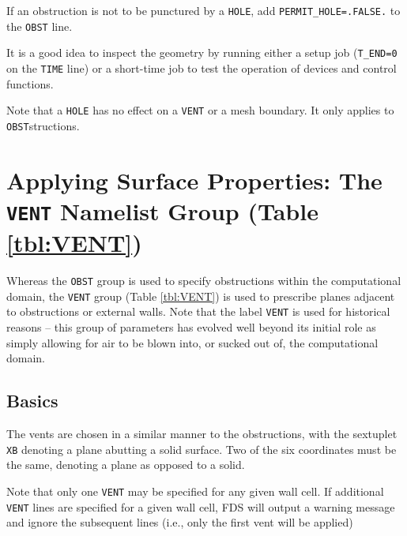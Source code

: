 \documentclass[11pt]{book}
\newcommand{\ct}{\tt\small}
\begin{document}
If an obstruction is not to be punctured by a {\ct HOLE}, add
{\ct PERMIT\_HOLE=.FALSE.} to the {\ct OBST} line.

\begin{warning}
\noindent
It is a good idea to inspect the geometry by running either a setup job
({\ct T\_END=0} on the {\ct TIME} line) or a short-time job to test the operation of devices and control functions.
\end{warning}

\begin{warning}
\noindent
Note that a {\ct HOLE} has no effect on a {\ct VENT} or a mesh boundary. It only applies to {\ct OBST}structions.
\end{warning}


\newpage

\section{Applying Surface Properties: The \texorpdfstring{{\tt VENT}}{VENT} Namelist Group (Table \ref{tbl:VENT})}
\label{info:VENT}

Whereas the {\ct OBST} group is used to specify obstructions within the
computational domain, the {\ct VENT} group (Table \ref{tbl:VENT}) is used to prescribe planes
adjacent to obstructions or external walls. Note that the label {\ct VENT} is used for historical reasons -- this group of parameters has
evolved well beyond its initial role as simply allowing for air to be blown into, or sucked out of, the computational domain.

\subsection{Basics}

\label{info:VENT_Basics}

The vents are chosen in a
similar manner to the obstructions, with the sextuplet {\ct XB}
denoting a plane abutting a solid surface. Two of the six coordinates must
be the same, denoting a plane as opposed to a solid.

\begin{warning}
\noindent
Note that only one {\ct VENT} may be specified for any given wall cell.  If additional {\ct VENT} lines are specified for a
given wall cell, FDS will output a warning message and ignore the subsequent lines (i.e., only the first vent
will be applied)
\end{warning}
\end{document}
